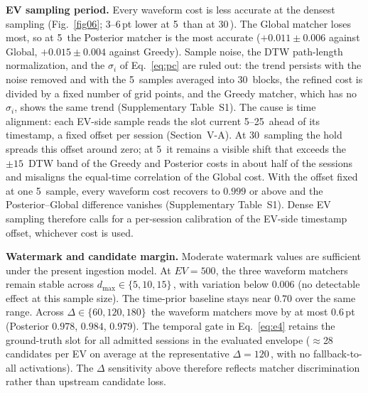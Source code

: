 \documentclass{ieeeaccess}
\newif\ifhighlight \highlightfalse
\DeclareRobustCommand{\revised}[1]{\ifhighlight{\color{blue}#1}\else{\color{.}#1}\fi}
\begin{document}
    \textbf{EV sampling period.}
    \revised{Every waveform cost is less accurate at the densest sampling (Fig.~\ref{fig06}; 3--6\,pt lower at 5\,\text{sec} than at 30\,\text{sec}).
    The Global matcher loses most, so at 5\,\text{sec} the Posterior matcher is the most accurate ($+0.011 \pm 0.006$ against Global, $+0.015 \pm 0.004$ against Greedy).
    Sample noise, the DTW path-length normalization, and the $\sigma_i$ of Eq.~\eqref{eq:pc} are ruled out: the trend persists with the noise removed and with the 5\,\text{sec} samples averaged into 30\,\text{sec} blocks, the refined cost is divided by a fixed number of grid points, and the Greedy matcher, which has no $\sigma_i$, shows the same trend (Supplementary Table~S1).
    The cause is time alignment: each EV-side sample reads the slot current 5--25\,\text{sec} ahead of its timestamp, a fixed offset per session (Section~V-A).
    At 30\,\text{sec} sampling the hold spreads this offset around zero; at 5\,\text{sec} it remains a visible shift that exceeds the $\pm 15$\,\text{sec} DTW band of the Greedy and Posterior costs in about half of the sessions and misaligns the equal-time correlation of the Global cost.
    With the offset fixed at one 5\,\text{sec} sample, every waveform cost recovers to $0.999$ or above and the Posterior--Global difference vanishes (Supplementary Table~S1).
    Dense EV sampling therefore calls for a per-session calibration of the EV-side timestamp offset, whichever cost is used.}

    \textbf{Watermark and candidate margin.}
    Moderate watermark values are sufficient under the present ingestion model.
    At $EV = 500$, the three \revised{waveform} matchers remain stable across $d_{\max} \in \{5, 10, 15\}$\,, with variation \revised{below $0.006$ (no detectable effect at this sample size)}.
    The time-prior baseline stays near $0.70$ over the same range.
    \revised{Across $\Delta \in \{60, 120, 180\}$\, the waveform matchers move by at most 0.6\,pt (Posterior $0.978$, $0.984$, $0.979$).}
    The temporal gate in Eq.~\eqref{eq:e4} retains the ground-truth slot for all admitted sessions in the evaluated envelope ($\approx$28 candidates per EV on average at the representative $\Delta = 120$\,, with no fallback-to-all activations).
    The $\Delta$ sensitivity above therefore reflects matcher discrimination rather than upstream candidate loss.
\end{document}
